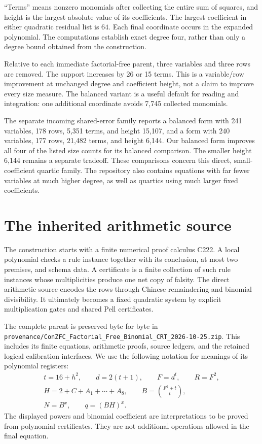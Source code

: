 \documentclass[11pt]{article}
\newcommand{\file}[1]{\nolinkurl{#1}}
\theoremstyle{remark}\newtheorem{remark}[theorem]{Remark}
\begin{document}
``Terms'' means nonzero monomials after collecting the entire sum of
squares, and height is the largest absolute value of its coefficients.
The largest coefficient in either quadratic residual list is $64$.
Each final coordinate occurs in the expanded polynomial. The computations
establish exact degree four, rather than only a degree bound obtained
from the construction.

Relative to each immediate factorial-free parent, three variables and
three rows are removed. The support increases by 26 or 15 terms. This
is a variable/row improvement at unchanged degree and coefficient height,
not a claim to improve every size measure. The balanced variant is a
useful default for reading and integration: one additional coordinate
avoids 7,745 collected monomials.

The separate incoming shared-error family reports a balanced form with
241 variables, 178 rows, 5,351 terms, and height 15,107, and a form with
240 variables, 177 rows, 21,482 terms, and height 6,144. Our balanced
form improves all four of the listed size counts for its balanced
comparison. The smaller height 6,144 remains a separate tradeoff.
These comparisons concern this direct, small-coefficient quartic family.
The repository also contains equations with far fewer variables at much
higher degree, as well as quartics using much larger fixed coefficients.

\section{The inherited arithmetic source}

The construction starts with a finite numerical proof calculus C222.
A local polynomial checks a rule instance together with its conclusion,
at most two premises, and schema data. A certificate is a finite collection
of such rule instances whose multiplicities produce one net copy of falsity.
The direct arithmetic source encodes the rows through Chinese remaindering
and binomial divisibility. It ultimately becomes a fixed quadratic system
by explicit multiplication gates and shared Pell certificates.

The complete parent is preserved byte for byte in
\file{provenance/ConZFC_Factorial_Free_Binomial_CRT_2026-10-25.zip}.
This includes its finite equations, arithmetic proofs, source ledgers,
and the retained logical calibration interfaces. We use the following
notation for meanings of its polynomial registers:
\begin{equation}\label{eq:meanings}
\begin{gathered}
 t=16+h^2,\qquad d=2(t+1),\qquad F=d^t,\qquad R=F^2,\\
 H=2+C+A_1+\cdots+A_8,\qquad B=\binom{F^2+t}{t},\\
 N=B^x,\qquad q=(BH)^x.
\end{gathered}
\end{equation}
The displayed powers and binomial coefficient are interpretations to
be proved from polynomial certificates. They are not additional
operations allowed in the final equation.
\end{document}
